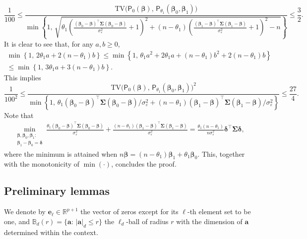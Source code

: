 \documentclass[11pt, a4paper]{article}
\newcommand{\mbf}{\mathbf}
\newcommand{\vep}{\varepsilon}
\renewcommand{\l}{\left}
\renewcommand{\r}{\right}
\newcommand{\cp}{\theta}
\newcommand{\p}{\mathsf{P}}
\newcommand{\R}{\mathbb{R}}
\theoremstyle{definition}
\theoremstyle{definition}
\theoremstyle{definition}
\theoremstyle{definition}
\theoremstyle{definition}
\theoremstyle{remark}
\theoremstyle{definition}
\theoremstyle{definition}
\theoremstyle{definition}
\begin{document}
$$
\frac{1}{100} \le \frac{\mathrm{TV} \bigl( \p_0(\bm\beta),\, \p_{\cp_1}(\bm\beta_0, \bm\beta_1) \bigr)}{\min\left\{ 1, \, \sqrt{\cp_1 \l(\frac{(\bm\beta_0 - \bm\beta)^\top \bm\Sigma(\bm\beta_0 - \bm\beta)}{\sigma_{\vep}^2} + 1\r)^2 + (n-\cp_1)\l(\frac{(\bm\beta_1 - \bm\beta)^\top \bm\Sigma(\bm\beta_1 - \bm\beta)}{\sigma_{\vep}^2} + 1\r)^2 - n}\right\}} \le \frac{3}{2}.
$$
It is clear to see that, for any $a,b\ge 0$,
\begin{multline*}
\min\l\{1,\, 2\cp_1 a +2(n-\cp_1)b\r\} \le \min\l\{1,\, \cp_1 a^2 + 2\cp_1 a +(n-\cp_1)b^2 + 2(n-\cp_1)b\r\}\\ \le 
\min\l\{1,\, 3\cp_1 a +3(n-\cp_1)b\r\}.
\end{multline*}
This implies 
$$
\frac{1}{100^2} \le \frac{\mathrm{TV} \bigl( \p_0(\bm\beta),\, \p_{\cp_1}(\bm\beta_0, \bm\beta_1) \bigr)^2}{\min\left\{ 1, \, {\cp_1 (\bm\beta_0 - \bm\beta)^\top \bm\Sigma(\bm\beta_0 - \bm\beta)/\sigma_{\vep}^2 + (n-\cp_1)(\bm\beta_1 - \bm\beta)^\top \bm\Sigma(\bm\beta_1 - \bm\beta)/\sigma_{\vep}^2}\right\}} \le \frac{27}{4}.
$$
Note that 
\begin{align*}
\min_{\substack{\bm\beta, \bm\beta_0, \bm\beta_1: \\ \bm\beta_1 - \bm\beta_0 = \bm\delta}}
\frac{\cp_1(\bm\beta_0 - \bm\beta)^\top \bm\Sigma(\bm\beta_0 - \bm\beta)}{\sigma_{\vep}^2} + \frac{(n-\cp_1)(\bm\beta_1 - \bm\beta)^\top \bm\Sigma(\bm\beta_1 - \bm\beta)}{\sigma_{\vep}^2} 
= \frac{\cp_1(n-\cp_1)}{n\sigma^2_\vep}\bm\delta^\top \bm\Sigma\bm\delta,
\end{align*}
where the minimum is attained when $n \bm\beta = (n-\cp_1)\bm\beta_1 + \cp_1\bm\beta_0$. This, together with the monotonicity of $\min(\cdot)$, concludes the proof. 

\subsection{Preliminary lemmas}

We denote by $\mbf e_\ell \in \R^{p + 1}$ the vector of zeros except for its $\ell$-th element set to be one, and $\mathbb{B}_d(r) = \{\mbf a: \, \vert \mbf a \vert_d \le r\}$ the $\ell_d$-ball of radius $r$ with the dimension of $\mbf a$ determined within the context.
\end{document}

